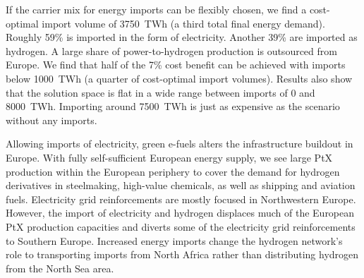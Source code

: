 \documentclass[10pt,5p,reversenotenum,lefttitle]{elsarticle}
\begin{document}
If the carrier mix for energy imports can be flexibly chosen, we find a
cost-optimal import volume of 3750~TWh (a third total final energy demand).
Roughly 59\% is imported in the form of electricity. Another 39\% are imported
as hydrogen. A large share of power-to-hydrogen production is outsourced from
Europe. We find that half of the 7\% cost benefit can be achieved with imports
below 1000~TWh (a quarter of cost-optimal import volumes). Results also show
that the solution space is flat in a wide range between imports of 0 and
8000~TWh. Importing around 7500~TWh is just as expensive as the scenario without
any imports.

Allowing imports of electricity, green e-fuels alters the infrastructure
buildout in Europe. With fully self-sufficient European energy supply, we see
large PtX production within the European periphery to cover the demand for
hydrogen derivatives in steelmaking, high-value chemicals, as well as shipping
and aviation fuels. Electricity grid reinforcements are mostly focused in
Northwestern Europe. However, the import of electricity and hydrogen displaces
much of the European PtX production capacities and diverts some of the
electricity grid reinforcements to Southern Europe. Increased energy imports
change the hydrogen network's role to transporting imports from North
Africa rather than distributing hydrogen from the North Sea area.
\end{document}
